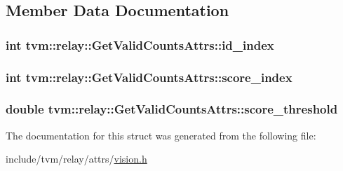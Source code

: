 \subsection{Member Data Documentation}
\subsubsection[{\texorpdfstring{id\+\_\+index}{id_index}}]{\setlength{\rightskip}{0pt plus 5cm}int tvm\+::relay\+::\+Get\+Valid\+Counts\+Attrs\+::id\+\_\+index}\hypertarget{structtvm_1_1relay_1_1GetValidCountsAttrs_ac389b60b8ef5e90becba282516860c8e}{}\label{structtvm_1_1relay_1_1GetValidCountsAttrs_ac389b60b8ef5e90becba282516860c8e}
\subsubsection[{\texorpdfstring{score\+\_\+index}{score_index}}]{\setlength{\rightskip}{0pt plus 5cm}int tvm\+::relay\+::\+Get\+Valid\+Counts\+Attrs\+::score\+\_\+index}\hypertarget{structtvm_1_1relay_1_1GetValidCountsAttrs_ac1f6c8ed8f47f543c20501af98cff87b}{}\label{structtvm_1_1relay_1_1GetValidCountsAttrs_ac1f6c8ed8f47f543c20501af98cff87b}
\subsubsection[{\texorpdfstring{score\+\_\+threshold}{score_threshold}}]{\setlength{\rightskip}{0pt plus 5cm}double tvm\+::relay\+::\+Get\+Valid\+Counts\+Attrs\+::score\+\_\+threshold}\hypertarget{structtvm_1_1relay_1_1GetValidCountsAttrs_a25784ba37934c8b489d17ff2fda2bdb7}{}\label{structtvm_1_1relay_1_1GetValidCountsAttrs_a25784ba37934c8b489d17ff2fda2bdb7}


The documentation for this struct was generated from the following file\+:\begin{DoxyCompactItemize}
\item 
include/tvm/relay/attrs/\hyperlink{vision_8h}{vision.\+h}\end{DoxyCompactItemize}
